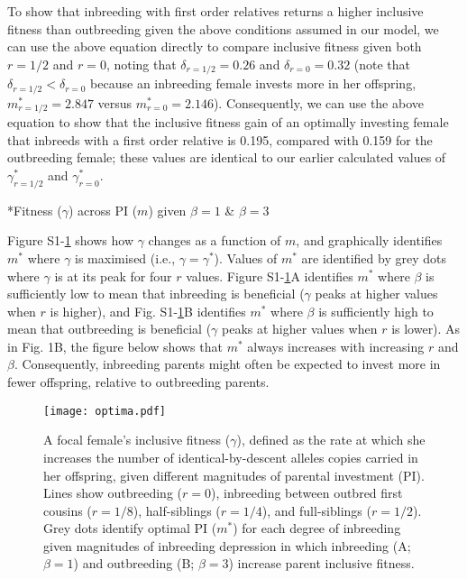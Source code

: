 \documentclass[12pt]{article}
\makeatletter
\renewcommand\section{\@startsection{section}{1}{0in}{-0.5\baselineskip}{0.1\baselineskip}{\normalfont\large\bfseries}}
\makeatother
\begin{document}
To show that inbreeding with first order relatives returns a higher inclusive fitness than outbreeding given the above conditions assumed in our model, we can use the above equation directly to compare inclusive fitness given both $r=1/2$ and $r=0$, noting that $\delta_{r=1/2}=0.26$ and $\delta_{r=0}=0.32$ (note that $\delta_{r=1/2}<\delta_{r=0}$ because an inbreeding female invests more in her offspring, $m^{*}_{r=1/2}=2.847$ versus $m^{*}_{r=0}=2.146$). Consequently, we can use the above equation to show that the inclusive fitness gain of an optimally investing female that inbreeds with a first order relative is 0.195, compared with 0.159 for the outbreeding female; these values are identical to our earlier calculated values of $\gamma^{*}_{r=1/2}$ and $\gamma^{*}_{r=0}$.

\clearpage

\section*{Fitness ($\gamma$) across PI ($m$) given $\beta=1$ \& $\beta=3$}

\noindent Figure S1-\ref{optima} shows how $\gamma$ changes as a function of $m$, and graphically identifies $m^{*}$ where $\gamma$ is maximised (i.e., $\gamma = \gamma^{*}$). Values of $m^{*}$ are identified by grey dots where $\gamma$ is at its peak for four $r$ values. Figure S1-\ref{optima}A identifies $m^{*}$ where $\beta$ is sufficiently low to mean that inbreeding is beneficial ($\gamma$ peaks at higher values when $r$ is higher), and Fig. S1-\ref{optima}B identifies $m^{*}$ where $\beta$ is sufficiently high to mean that outbreeding is beneficial ($\gamma$ peaks at higher values when $r$ is lower). As in Fig. 1B, the figure below shows that $m^{*}$ always increases with increasing $r$ and $\beta$. Consequently, inbreeding parents might often be expected to invest more in fewer offspring, relative to outbreeding parents.

\begin{figure}[H]
\begin{center}				
\texttt{[image: optima.pdf]}
\end{center}
\caption{A focal female's inclusive fitness ($\gamma$), defined as the rate at which she increases the number of identical-by-descent alleles copies carried in her offspring, given different magnitudes of parental investment (PI). Lines show outbreeding ($r=0$), inbreeding between outbred first cousins ($r=1/8$), half-siblings ($r=1/4$), and full-siblings ($r=1/2$). Grey dots identify optimal PI ($m^{*}$) for each degree of inbreeding given magnitudes of inbreeding depression in which inbreeding (A; $\beta=1$) and outbreeding (B; $\beta=3$) increase parent inclusive fitness.}
\label{optima}
\end{figure}
\end{document}
